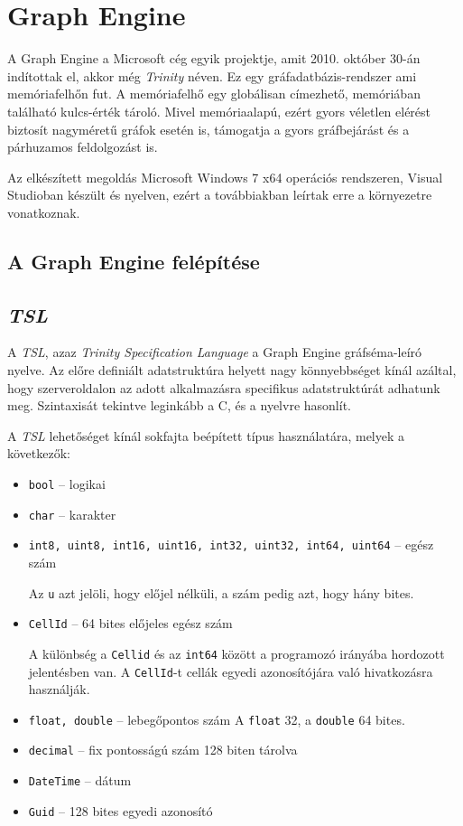 \chapter{Graph Engine}

A Graph Engine a Microsoft cég egyik projektje, amit 2010. október 30-án indítottak el, akkor még \emph{Trinity} néven. Ez egy gráfadatbázis-rendszer ami memóriafelhőn fut. A memóriafelhő egy globálisan címezhető, memóriában található kulcs-érték tároló. Mivel memóriaalapú, ezért gyors véletlen elérést biztosít nagyméretű gráfok esetén is, támogatja a gyors gráfbejárást és a párhuzamos feldolgozást is.

Az elkészített megoldás Microsoft Windows 7 x64 operációs rendszeren, Visual Studioban készült és \Csh{} nyelven, ezért a továbbiakban leírtak erre a környezetre vonatkoznak.


\section{A Graph Engine felépítése}

\section{\emph{TSL}}

A \emph{TSL}, azaz \emph{Trinity Specification Language} a Graph Engine gráfséma-leíró nyelve. Az előre definiált adatstruktúra helyett nagy könnyebbséget kínál azáltal, hogy szerveroldalon az adott alkalmazásra specifikus adatstruktúrát adhatunk meg. Szintaxisát tekintve leginkább a C, \cpp{}  és a \Csh{} nyelvre hasonlít.

A \emph{TSL} lehetőséget kínál sokfajta beépített típus használatára, melyek a következők:
\begin{itemize}
	\item \texttt{bool} \--- logikai
	\item \texttt{char} \--- karakter
	\item \texttt{int8, uint8, int16, uint16, int32, uint32, int64, uint64} \--- egész szám 
		
		Az \texttt{u} azt jelöli, hogy előjel nélküli, a szám pedig azt, hogy hány bites.
	\item \texttt{CellId} \--- 64 bites előjeles egész szám
		
		A különbség a \texttt{Cellid} és az \texttt{int64} között a programozó irányába hordozott jelentésben van. A \texttt{CellId}-t cellák egyedi azonosítójára való hivatkozásra használják.
	\item \texttt{float, double} \--- lebegőpontos szám
		A \texttt{float} 32, a \texttt{double} 64 bites.
	\item \texttt{decimal} \--- fix pontosságú szám 128 biten tárolva
	\item \texttt{DateTime} \--- dátum
	\item \texttt{Guid} \--- 128 bites egyedi azonosító
\end{itemize}

